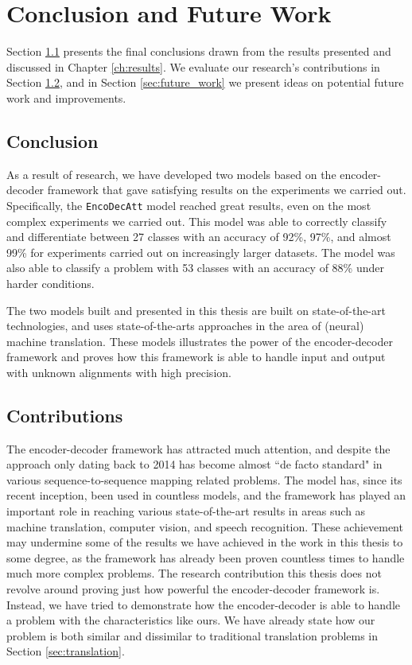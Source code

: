 
\chapter{Conclusion and Future Work}
\label{ch:conclusion}
Section \ref{sec:conclusion} presents the final conclusions drawn from the results presented and discussed in Chapter \ref{ch:results}. We evaluate our research's contributions in Section \ref{sec:contributions_final}, and in Section \ref{sec:future_work} we present ideas on potential future work and improvements.

\section{Conclusion}
\label{sec:conclusion}
As a result of research, we have developed two models based on the encoder-decoder framework that gave satisfying results on the experiments we carried out. Specifically, the {\tt EncoDecAtt} model reached great results, even on the most complex experiments we carried out. This model was able to correctly classify and differentiate between 27 classes with an accuracy of 92\%, 97\%, and almost 99\% for experiments carried out on increasingly larger datasets. The model was also able to classify a problem with 53 classes with an accuracy of 88\% under harder conditions.

The two models built and presented in this thesis are built on state-of-the-art technologies, and uses state-of-the-arts approaches in the area of (neural) machine translation. These models illustrates the power of the encoder-decoder framework and proves how this framework is able to handle input and output with unknown alignments with high precision.


\section{Contributions}
\label{sec:contributions_final}

The encoder-decoder framework has attracted much attention, and despite the approach only dating back to 2014 has become almost ``de facto standard" in various sequence-to-sequence mapping related problems. The model has, since its recent inception, been used in countless models, and the framework has played an important role in reaching various state-of-the-art results in areas such as machine translation, computer vision, and speech recognition. These achievement may undermine some of the results we have achieved in the work in this thesis to some degree, as the framework has already been proven countless times to handle much more complex problems. The research contribution this thesis does not revolve around proving just how powerful the encoder-decoder framework is. Instead, we have tried to demonstrate how the encoder-decoder is able to handle a problem with the characteristics like ours. We have already state how our problem is both similar and dissimilar to traditional translation problems in Section \ref{sec:translation}.

